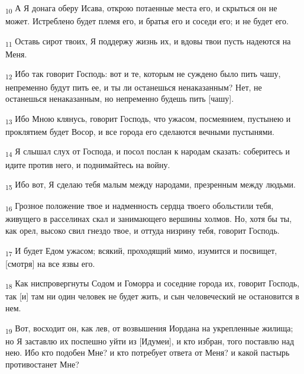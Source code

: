 \begin{tcolorbox}
\textsubscript{10} А Я донага оберу Исава, открою потаенные места его, и скрыться он не может. Истреблено будет племя его, и братья его и соседи его; и не будет его.
\end{tcolorbox}
\begin{tcolorbox}
\textsubscript{11} Оставь сирот твоих, Я поддержу жизнь их, и вдовы твои пусть надеются на Меня.
\end{tcolorbox}
\begin{tcolorbox}
\textsubscript{12} Ибо так говорит Господь: вот и те, которым не суждено было пить чашу, непременно будут пить ее, и ты ли останешься ненаказанным? Нет, не останешься ненаказанным, но непременно будешь пить [чашу].
\end{tcolorbox}
\begin{tcolorbox}
\textsubscript{13} Ибо Мною клянусь, говорит Господь, что ужасом, посмеянием, пустынею и проклятием будет Восор, и все города его сделаются вечными пустынями.
\end{tcolorbox}
\begin{tcolorbox}
\textsubscript{14} Я слышал слух от Господа, и посол послан к народам сказать: соберитесь и идите против него, и поднимайтесь на войну.
\end{tcolorbox}
\begin{tcolorbox}
\textsubscript{15} Ибо вот, Я сделаю тебя малым между народами, презренным между людьми.
\end{tcolorbox}
\begin{tcolorbox}
\textsubscript{16} Грозное положение твое и надменность сердца твоего обольстили тебя, живущего в расселинах скал и занимающего вершины холмов. Но, хотя бы ты, как орел, высоко свил гнездо твое, и оттуда низрину тебя, говорит Господь.
\end{tcolorbox}
\begin{tcolorbox}
\textsubscript{17} И будет Едом ужасом; всякий, проходящий мимо, изумится и посвищет, [смотря] на все язвы его.
\end{tcolorbox}
\begin{tcolorbox}
\textsubscript{18} Как ниспровергнуты Содом и Гоморра и соседние города их, говорит Господь, так [и] там ни один человек не будет жить, и сын человеческий не остановится в нем.
\end{tcolorbox}
\begin{tcolorbox}
\textsubscript{19} Вот, восходит он, как лев, от возвышения Иордана на укрепленные жилища; но Я заставлю их поспешно уйти из [Идумеи], и кто избран, того поставлю над нею. Ибо кто подобен Мне? и кто потребует ответа от Меня? и какой пастырь противостанет Мне?
\end{tcolorbox}
